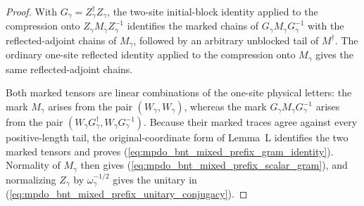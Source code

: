 \begin{proof}\leanok
    With $G_\gamma=Z_\gamma^\dagger Z_\gamma$, the two-site initial-block
    identity applied to the compression onto
    $Z_\gamma M_\gamma Z_\gamma^{-1}$ identifies the marked chains of
    $G_\gamma M_\gamma G_\gamma^{-1}$ with the reflected-adjoint chains of
    $M_\gamma$, followed by an arbitrary unblocked tail of $M^\dagger$.
    The ordinary one-site reflected identity applied to the compression onto
    $M_\gamma$ gives the same reflected-adjoint chains.

    Both marked tensors are linear combinations of the one-site physical
    letters: the mark $M_\gamma$ arises from the pair
    $(W_\gamma,W_\gamma)$, whereas the mark
    $G_\gamma M_\gamma G_\gamma^{-1}$ arises from the pair
    $(W_\gamma G_\gamma^\dagger,W_\gamma G_\gamma^{-1})$.
    Because their marked traces agree against every positive-length tail, the
    original-coordinate form of Lemma~L identifies the two marked
    tensors and proves
    (\ref{eq:mpdo_bnt_mixed_prefix_gram_identity}). Normality of
    $M_\gamma$ then gives
    (\ref{eq:mpdo_bnt_mixed_prefix_scalar_gram}), and normalizing
    $Z_\gamma$ by $\omega_\gamma^{-1/2}$ gives the unitary in
    (\ref{eq:mpdo_bnt_mixed_prefix_unitary_conjugacy}).
\end{proof}
